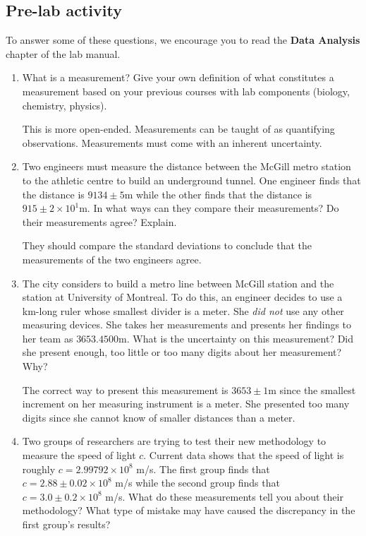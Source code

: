 \documentclass[12pt]{report}
\begin{document}
\subsection{Pre-lab activity}
To answer some of these questions, we encourage you to read the \textbf{Data Analysis} chapter of the lab manual.
\begin{enumerate}
\item What is a measurement? Give your own definition of what constitutes a measurement based on your previous courses with lab components (biology, chemistry, physics).
\begin{tcolorbox}[title=Answer]
This is more open-ended. Measurements can be taught of as quantifying observations. Measurements must come with an inherent uncertainty.
\end{tcolorbox}
\item Two engineers must measure the distance between the McGill metro station to the athletic centre to build an underground tunnel. One engineer finds that the distance is $9134 \pm 5$m while the other finds that the distance is $915 \pm 2 \times 10^1$m. In what ways can they compare their measurements? Do their measurements agree? Explain.
\begin{tcolorbox}[title=Answer]
They should compare the standard deviations to conclude that the measurements of the two engineers agree.
\end{tcolorbox}
\item The city considers to build a metro line between McGill station and the station at University of Montreal. To do this, an engineer decides to use a km-long ruler whose smallest divider is a meter. She \textit{did not} use any other measuring devices. She takes her measurements and presents her findings to her team as $3653.4500$m. What is the uncertainty on this measurement? Did she present enough, too little or too many digits about her measurement? Why?
\begin{tcolorbox}[title=Answer]
The correct way to present this measurement is $3653 \pm 1$m since the smallest increment on her measuring instrument is a meter. She presented too many digits since she cannot know of smaller distances than a meter.
\end{tcolorbox}
\item Two groups of researchers are trying to test their new methodology to measure the speed of light $c$. Current data shows that the speed of light is roughly $c=2.99 792 \times 10^8$ m/s. The first group finds that $c=2.88 \pm 0.02 \times 10^8$ m/s while the second group finds that $c=3.0 \pm 0.2 \times 10^8$ m/s. What do these measurements tell you about their methodology? What type of mistake may have caused the discrepancy in the first group's results?

\end{enumerate}
\end{document}
